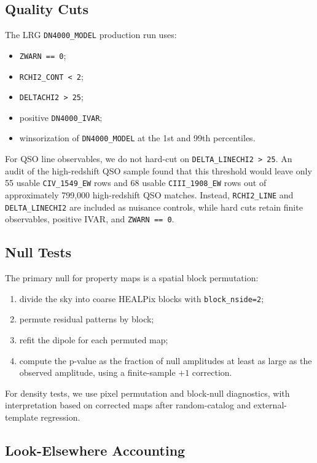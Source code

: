 \documentclass[11pt]{article}
\begin{document}
\subsection{Quality Cuts}

The LRG \texttt{DN4000\_MODEL} production run uses:
\begin{itemize}
    \item \texttt{ZWARN == 0};
    \item \texttt{RCHI2\_CONT < 2};
    \item \texttt{DELTACHI2 > 25};
    \item positive \texttt{DN4000\_IVAR};
    \item winsorization of \texttt{DN4000\_MODEL} at the 1st and 99th percentiles.
\end{itemize}

For QSO line observables, we do not hard-cut on \texttt{DELTA\_LINECHI2 > 25}. An audit of the high-redshift QSO sample found that this threshold would leave only 55 usable \texttt{CIV\_1549\_EW} rows and 68 usable \texttt{CIII\_1908\_EW} rows out of approximately 799,000 high-redshift QSO matches. Instead, \texttt{RCHI2\_LINE} and \texttt{DELTA\_LINECHI2} are included as nuisance controls, while hard cuts retain finite observables, positive IVAR, and \texttt{ZWARN == 0}.

\subsection{Null Tests}

The primary null for property maps is a spatial block permutation:
\begin{enumerate}
    \item divide the sky into coarse HEALPix blocks with \texttt{block\_nside=2};
    \item permute residual patterns by block;
    \item refit the dipole for each permuted map;
    \item compute the p-value as the fraction of null amplitudes at least as large as the observed amplitude, using a finite-sample $+1$ correction.
\end{enumerate}

For density tests, we use pixel permutation and block-null diagnostics, with interpretation based on corrected maps after random-catalog and external-template regression.

\subsection{Look-Elsewhere Accounting}
\end{document}
